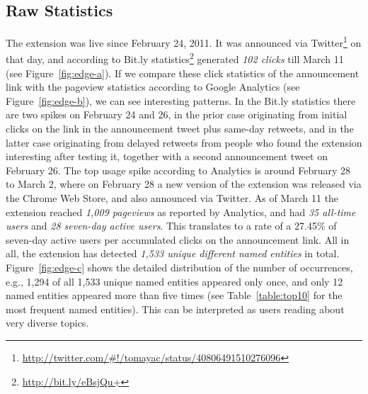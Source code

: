 \documentclass[runningheads,a4paper]{llncs}
\begin{document}
\subsection{Raw Statistics}
The extension was live since February 24, 2011. It was announced via Twitter\footnote{\url{http://twitter.com/#!/tomayac/status/40806491510276096}} on that day, and according to Bit.ly statistics\footnote{\url{http://bit.ly/eBsjQu+}} generated \textit{102 clicks} till March 11 (see Figure~\ref{fig:edge-a}). If we compare these click statistics of the announcement link with the pageview statistics according to Google Analytics (see Figure~\ref{fig:edge-b}), we can see interesting patterns. In the Bit.ly statistics there are two spikes on February 24 and 26, in the prior case originating from initial clicks on the link in the announcement tweet plus same-day retweets, and in the latter case originating from delayed retweets from people who found the extension interesting after testing it, together with a second announcement tweet on February 26. The top usage spike according to Analytics is around February 28 to March 2, where on February 28 a new version of the extension was released via the Chrome Web Store, and also announced via Twitter. As of March 11 the extension reached \textit{1,009 pageviews} as reported by Analytics, and had \textit{35 all-time users} and \textit{28 seven-day active users}. This translates to a rate of a 27.45\% of seven-day active users per accumulated clicks on the announcement link. All in all, the extension has detected \textit{1,533 unique different named entities} in total. Figure~\ref{fig:edge-c} shows the detailed distribution of the number of occurrences, e.g., 1,294 of all 1,533 unique named entities appeared only once, and only 12 named entities appeared more than five times (see Table~\ref{table:top10} for the most frequent named entities).  This can be interpreted as users reading about very diverse topics.

\end{document}
